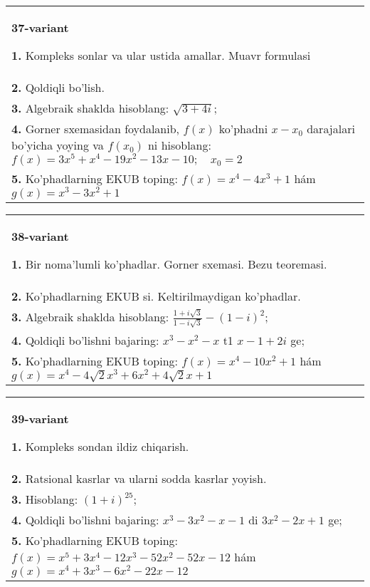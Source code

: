\documentclass{article}
\begin{document}
\begin{tabular}{m{17cm}}
\textbf{37-variant}
\newline

\textbf{1.} Kompleks sonlar va ular ustida amallar. Muavr formulasi  \\
\textbf{2.} Qoldiqli bo’lish.  \\
\textbf{3.} Algebraik shaklda hisoblang:  $\sqrt{3+4 i}$; \\
\textbf{4.} Gorner sxemasidan foydalanib, $f(x)$ ko’phadni $x-x_0$ darajalari bo’yicha yoying va $f\left(x_0\right)$ ni hisoblang: $f(x)=3 x^5+x^4-19 x^2-13 x-10 ; \quad x_0=2$ \\
\textbf{5.} Ko’phadlarning EKUB toping:  $f(x)=x^4-4 x^3+1$ hám $g(x)=x^3-3 x^2+1$ \\

\end{tabular}
\vspace{1cm}


\begin{tabular}{m{17cm}}
\textbf{38-variant}
\newline

\textbf{1.} Bir noma’lumli ko’phadlar. Gorner sxemasi. Bezu teoremasi.  \\
\textbf{2.} Ko’phadlarning EKUB si. Keltirilmaydigan ko’phadlar. \\
\textbf{3.} Algebraik shaklda hisoblang: $\frac{1+i \sqrt{3}}{1-i \sqrt{3}}-(1-i)^2$; \\
\textbf{4.} Qoldiqli bo’lishni bajaring:  $x^3-x^2-x$ t1 $x-1+2 i$ ge; \\
\textbf{5.} Ko’phadlarning EKUB toping:  $f(x)=x^4-10 x^2+1$ hám $g(x)=x^4-4 \sqrt{2} x^3+6 x^2+4 \sqrt{2} x+1$ \\

\end{tabular}
\vspace{1cm}


\begin{tabular}{m{17cm}}
\textbf{39-variant}
\newline

\textbf{1.} Kompleks sondan ildiz chiqarish. \\
\textbf{2.} Ratsional kasrlar va ularni sodda kasrlar yoyish. \\
\textbf{3.} Hisoblang:  $(1+i)^{25}$; \\
\textbf{4.} Qoldiqli bo’lishni bajaring: $x^3-3 x^2-x-1$ di $3 x^2-2 x+1$ ge; \\
\textbf{5.} Ko’phadlarning EKUB toping:  $f(x)=x^5+3 x^4-12 x^3-52 x^2-52 x-12$ hám $g(x)=x^4+3 x^3-6 x^2-22 x-12$ \\

\end{tabular}
\vspace{1cm}
\end{document}
